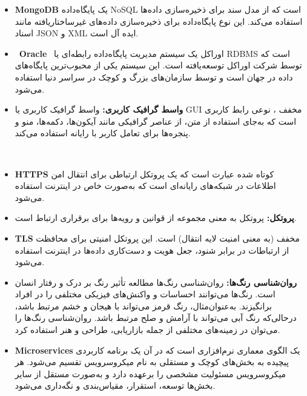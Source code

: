 \documentclass[12pt,a4paper,oneside]{article}
\begin{document}
\begin{itemize}
					    \item 
					   \textbf{MongoDB\rl{:}\label{ref:mongo}}
					   یک پایگاه‌داده NoSQL است که از مدل سند برای ذخیره‌سازی داده‌ها استفاده می‌کند. این نوع پایگاه‌داده برای ذخیره‌سازی داده‌های غیرساختاریافته مانند اسناد JSON و XML ایده آل است.
					   
					   \item 
					    \textbf{Oracle\rl{:}\label{ref:oracle}}
					    اوراکل یک سیستم مدیریت پایگاه‌داده رابطه‌ای یا RDBMS است که توسط شرکت اوراکل توسعه‌یافته است. این سیستم یکی از محبوب‌ترین پایگاه‌های داده در جهان است و توسط سازمان‌های بزرگ و کوچک در سراسر دنیا استفاده می‌شود.

					   \item
					   \textbf{واسط گرافیک کاربری:\label{ref:gui}}
					    واسط گرافیک کاربری یا GUI مخفف
					    ، نوعی رابط کاربری است که به‌جای استفاده از متن، از عناصر گرافیکی مانند آیکون‌ها، دکمه‌ها، منو و پنجره‌ها برای تعامل کاربر با رایانه استفاده می‌کند.

						 \item 
						\textbf{HTTPS\label{ref:https}}
						 کوتاه شده عبارت 
						  است که یک پروتکل ارتباطی برای انتقال امن اطلاعات در شبکه‌های رایانه‌ای است که به‌صورت خاص در اینترنت استفاده می‌شود.
						  
						\item 
						\textbf{پروتکل:\label{ref:protocol}}
						 پروتکل به معنی مجموعه از قوانین و رویه‌ها برای برقراری ارتباط است.
						 
						\item 
						\textbf{TLS\label{ref:tls}}
						 مخفف 
						  (به معنی امنیت لایه انتقال) است. این پروتکل امنیتی برای محافظت از ارتباطات در برابر شنود، جعل هویت و دست‌کاری داده‌ها در اینترنت استفاده می‌شود.
	  
						  \item
						  \textbf{روان‌شناسی رنگ‌ها:\label{ref:colorpsychology}}
						   روان‌شناسی رنگ‌ها مطالعه تأثیر رنگ بر درک و رفتار انسان است. رنگ‌ها می‌توانند احساسات و واکنش‌های فیزیکی مختلفی را در افراد برانگیزند. به‌عنوان‌مثال، رنگ قرمز می‌تواند با هیجان و خشم مرتبط باشد، درحالی‌که رنگ آبی می‌تواند با آرامش و صلح مرتبط باشد. روان‌شناسی رنگ‌ها را می‌توان در زمینه‌های مختلفی از جمله بازاریابی، طراحی و هنر استفاده کرد.
						  
						  \item
						  \textbf{Microservices\rl{:}\label{ref:microservice}}
						یک الگوی معماری نرم‌افزاری است که در آن یک برنامه کاربردی پیچیده به بخش‌های کوچک و مستقلی به نام میکروسرویس تقسیم می‌شود. هر میکروسرویس مسئولیت مشخصی را برعهده دارد و به‌صورت مستقل از سایر بخش‌ها توسعه، استقرار، مقیاس‌بندی و نگه‌داری می‌شود.
						  

\end{itemize}
\end{document}
